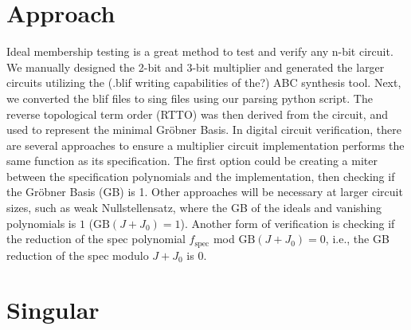 \documentclass[conference]{IEEEtran}
\begin{document}
\section{Approach}
Ideal membership testing is a great method to test and verify any n-bit circuit.
We manually designed the 2-bit and 3-bit multiplier and generated the larger circuits utilizing the (.blif writing capabilities of the?) ABC synthesis tool. Next, we
converted the blif files to sing files using our parsing python script. The reverse topological term order (RTTO) was then derived from the circuit, and used to
represent the minimal Gröbner Basis. In digital circuit verification, there are several approaches to ensure a multiplier circuit implementation performs the same function as its specification. The first 
option could be creating a miter between the specification polynomials and the implementation, then checking if the Gröbner Basis (GB) is 1. Other approaches will be necessary at larger circuit sizes, 
such as weak Nullstellensatz, where the GB of the ideals and vanishing polynomials is $1$ ($\text{GB}(J + J_{0}) = 1$). Another form of verification is checking if the reduction of the spec 
polynomial $f_{\text{spec}}$ mod $\text{GB}(J + J_{0}) = 0$, i.e., the GB reduction of the spec modulo $J+J_{0}$ is $0$.

\section{Singular}
\end{document}
